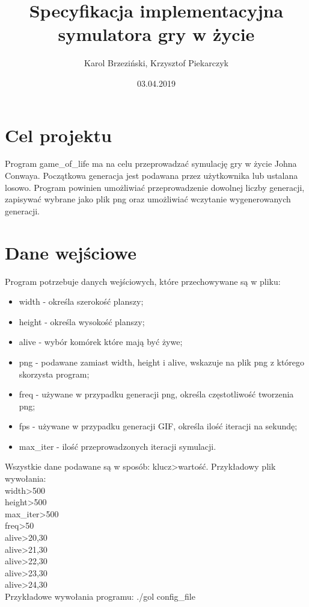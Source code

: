 \documentclass[12pt]{article}
\title{Specyfikacja implementacyjna symulatora gry w życie}
\author{Karol Brzeziński, Krzysztof Piekarczyk}
\date{03.04.2019}
\begin{document}
\maketitle

\section{Cel projektu}

Program game\_of\_life ma na celu przeprowadzać symulację gry w życie Johna Conwaya. Początkowa generacja jest podawana przez użytkownika lub ustalana losowo. Program powinien umożliwiać przeprowadzenie dowolnej liczby generacji, zapisywać wybrane jako plik png oraz umożliwiać wczytanie wygenerowanych generacji.


\section{Dane wejściowe}

Program potrzebuje danych wejściowych, które przechowywane są w pliku:
\begin{itemize}
	\item width - określa szerokość planszy;
	\item height - określa wysokość planszy;
	\item alive - wybór komórek które mają być żywe;
	\item png - podawane zamiast width, height i alive, wskazuje na plik png z którego skorzysta program;
	\item freq - używane w przypadku generacji png, określa częstotliwość tworzenia png;
	\item fps - używane w przypadku generacji GIF, określa ilość iteracji na sekundę;
	\item max\_iter - ilość przeprowadzonych iteracji symulacji.
\end{itemize}

Wszystkie dane podawane są w sposób: klucz\textgreater{}wartość.
Przykładowy plik wywołania:\\
width\textgreater{}500\\
height\textgreater{}500\\
max\_iter\textgreater{}500\\
freq\textgreater{}50\\
alive\textgreater{}20,30\\
alive\textgreater{}21,30\\
alive\textgreater{}22,30\\
alive\textgreater{}23,30\\
alive\textgreater{}24,30\\
Przykładowe wywołania programu:	./gol config\_file
\end{document}
